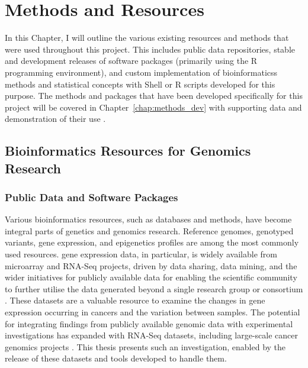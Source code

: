 \chapter{Methods and Resources}
\label{chap:methods}

In this Chapter, I will outline the various existing resources and methods that were used throughout this project. This includes public data repositories, stable and development releases of software packages (primarily using the R programming environment), and custom implementation of \glspl{bioinformatics} methods and statistical concepts with Shell or R scripts developed for this purpose. The methods and packages that have been developed specifically for this project will be covered in Chapter~\ref{chap:methods_dev} with supporting data and demonstration of their use . 

\section{Bioinformatics Resources for Genomics Research}
\subsection{Public Data and Software Packages}
Various \gls{bioinformatics} resources, such as databases and methods, have become integral parts of genetics and \glspl{genomic} research. Reference \glspl{genome}, genotyped variants, \gls{gene expression}, and epigenetics profiles are among the most commonly used resources. \Gls{gene expression} data, in particular, is widely available from \gls{microarray} and \gls{RNA-Seq} projects, %
driven by data sharing, data mining, and the wider initiatives for publicly available data for enabling the scientific community to further utilise the data generated beyond a single research group or consortium \citep{Rung2013}. 
These datasets are a valuable resource to examine the changes in \gls{gene expression} occurring in cancers and the variation between samples. The potential for integrating findings from publicly available \gls{genomic} data with experimental investigations has expanded with \gls{RNA-Seq} datasets, including large-scale cancer \glspl{genomic} projects \citep{ICGC2011}. This thesis presents such an investigation, enabled by the release of these datasets and tools developed %
to handle them.
 

